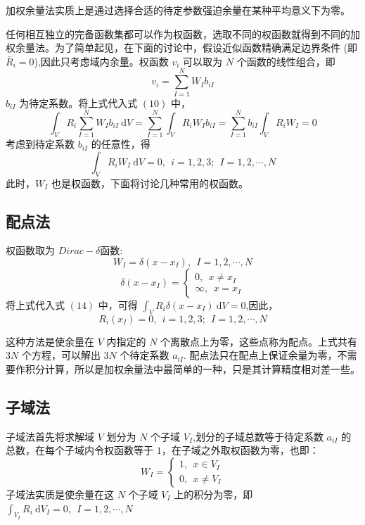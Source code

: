 \documentclass[12pt,a4paper]{article}
\begin{document}
加权余量法实质上是通过选择合适的待定参数强迫余量在某种平均意义下为零。

任何相互独立的完备函数集都可以作为权函数，选取不同的权函数就得到不同的加权余量法。为了简单起见，在下面的讨论中，假设近似函数精确满足边界条件 (即 $\bar{R}_i = 0$),因此只考虑域内余量。权函数 $v_i$ 可以取为 $N$ 个函数的线性组合，即
\begin{equation}
v_i=\sum_{I=1}^N W_I b_{iI}
\end{equation}
$b_{iI}$ 为待定系数。将上式代入式 $(10)$ 中，
$$
\int_{V} R_i\sum_{I=1}^N W_I b_{iI} ~ \mathrm{d}V=\sum_{I=1}^N\int_{V} R_i W_I b_{iI}=\sum_{I=1}^N b_{iI}\int_{V} R_i W_I=0
$$
考虑到待定系数 $b_{iI}$ 的任意性，得
\begin{equation}
\int_{V} R_i W_I ~ \mathrm{d}V=0,~~i=1,2,3;~~I=1,2,\cdots ,N
\end{equation}
此时，$W_I$ 也是权函数，下面将讨论几种常用的权函数。

\subsection{配点法}
权函数取为 $Dirac-\delta$函数:
\begin{equation}
W_I=\delta(x-x_I),~~I=1,2,\cdots ,N
\end{equation}
$$
\delta(x-x_I)
=\begin{cases}
0,~~x\ne x_I \\
\infty ,~~x=x_I
\end{cases}
$$
将上式代入式 $(14)$ 中，可得 $\int_{V} R_i\delta(x-x_I) ~ \mathrm{d}V=0$,因此，
\begin{equation}
R_i(x_I)=0,~~i=1,2,3;~~I=1,2,\cdots ,N
\end{equation}

这种方法是使余量在 $V$ 内指定的 $N$ 个离散点上为零，这些点称为配点。上式共有 $3N$ 个方程，可以解出 $3N$ 个待定系数 $a_{iI}$.
配点法只在配点上保证余量为零，不需要作积分计算，所以是加权余量法中最简单的一种，只是其计算精度相对差一些。

\subsection{子域法}
子域法首先将求解域 $V$ 划分为 $N$ 个子域 $V_I$,划分的子域总数等于待定系数 $a_{iI}$ 的总数，在每个子域内令权函数等于 $1$，在子域之外取权函数为零，也即：
\begin{equation}
W_I=\begin{cases}
1,~~x\in V_I \\
0,~~x\ne V_I
\end{cases}
\end{equation}
子域法实质是使余量在这 $N$ 个子域 $V_I$ 上的积分为零，即 $\int_{V_I} R_i~ \mathrm{d}V_I=0,~~I=1,2,\cdots ,N$
\end{document}
